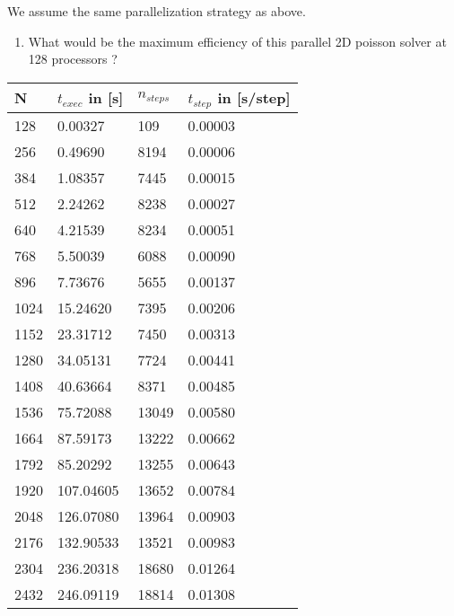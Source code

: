 \documentclass[11pt,a4paper]{article}
\begin{document}
\begin{exercise}
$~$ %

We assume the same parallelization strategy as above.

\begin{enumerate}[label=(\alph*)]
	\item What would be the maximum efficiency of this parallel 2D poisson solver at 128 processors ?

\end{enumerate}
  

\end{exercise}


\begin{table}[!ht]
\centering
\begin{tabular}{ | l | l | l | l |} 
\hline 
\textbf{N} & \textbf{$t_{exec}$} in [s] & \textbf{$n_{steps}$} & \textbf{$t_{step}$} in [s/step] \\ 
\hline 
 128 & 0.00327 & 109 & 0.00003 \\ 
\hline 
 256 & 0.49690 & 8194 & 0.00006 \\ 
\hline 
 384 & 1.08357 & 7445 & 0.00015 \\ 
\hline 
 512 & 2.24262 & 8238 & 0.00027 \\ 
\hline 
 640 & 4.21539 & 8234 & 0.00051 \\ 
\hline 
 768 & 5.50039 & 6088 & 0.00090 \\ 
\hline 
 896 & 7.73676 & 5655 & 0.00137 \\ 
\hline 
 1024 & 15.24620 & 7395 & 0.00206 \\ 
\hline 
 1152 & 23.31712 & 7450 & 0.00313 \\ 
\hline 
 1280 & 34.05131 & 7724 & 0.00441 \\ 
\hline 
 1408 & 40.63664 & 8371 & 0.00485 \\ 
\hline 
 1536 & 75.72088 & 13049 & 0.00580 \\ 
\hline 
 1664 & 87.59173 & 13222 & 0.00662 \\ 
\hline 
 1792 & 85.20292 & 13255 & 0.00643 \\ 
\hline 
 1920 & 107.04605 & 13652 & 0.00784 \\ 
\hline 
 2048 & 126.07080 & 13964 & 0.00903 \\ 
\hline 
 2176 & 132.90533 & 13521 & 0.00983 \\ 
\hline 
 2304 & 236.20318 & 18680 & 0.01264 \\ 
\hline 
 2432 & 246.09119 & 18814 & 0.01308 \\ 

\end{tabular}
\end{table}
\end{document}
